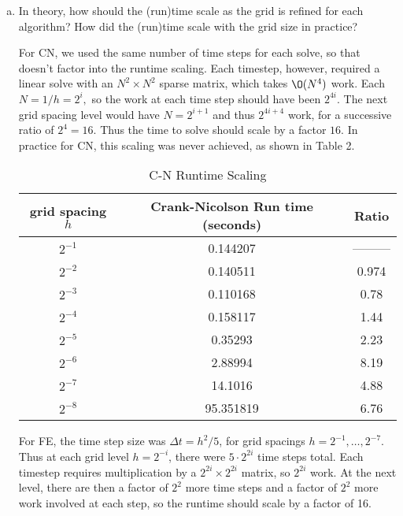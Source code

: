 \documentclass[12pt]{article}
\begin{document}
\begin{enumerate}[(a)]
\item In theory, how should the (run)time scale as the grid is refined for each algorithm? How did the (run)time scale with the grid size in practice?

For CN, we used the same number of time steps for each solve, so that doesn't factor into the runtime scaling.  Each timestep, however, required a linear solve with an $N^2\times N^2$ sparse matrix, which takes $\O(N^4)$ work.  Each $N = 1/h = 2^{i},$ so the work at each time step should have been $2^{4i}$. The next grid spacing level would have $N=2^{i+1}$ and thus $2^{4i+4}$ work, for a successive ratio of $2^{4}=16$.  Thus the time to solve should scale by a factor $16$. In practice for CN, this scaling was never achieved, as shown in Table 2.

\begin{table}[H]
\caption{C-N Runtime Scaling}
\centering\begin{tabular}{||c|c|c||}
\hline \hline
   grid spacing $h$ &  Crank-Nicolson Run time (seconds) &   Ratio \\
\hline
    $2^{-1}$ &                  0.144207 &                 --------- \\
    $2^{-2}$ &                  0.140511 &                 0.974 \\
    $2^{-3}$ &                  0.110168 &                 0.78  \\
    $2^{-4}$ &                  0.158117 &                 1.44 \\
    $2^{-5}$ &                  0.35293  &                 2.23  \\
    $2^{-6}$ &                  2.88994  &                8.19   \\
    $2^{-7}$ &                 14.1016   &               4.88    \\
    $2^{-8}$ &                 95.351819 &               6.76 \\ 
\hline \hline
\end{tabular}
\end{table}

For FE, the time step size was $\Delta t = h^2/5$, for grid spacings $h=2^{-1},\dots,2^{-7}$.  Thus at each grid level $h=2^{-i}$, there were $5\cdot2^{2i}$ time steps total.  Each timestep requires multiplication by a $2^{2i} \times 2^{2i}$ matrix, so $2^{2i}$ work.  At the next level, there are then a factor of $2^{2}$ more time steps and a factor of $2^2$ more work involved at each step, so the runtime should scale by a factor of 16.


\end{enumerate}
\end{document}

